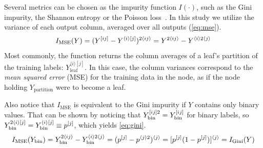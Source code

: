 Several metrics can be chosen as the impurity function $I(\cdot)$, such as the Gini impurity, the Shannon entropy or the Poisson loss~\cite{breiman1984classification}.  %
In this study we utilize the variance of each output column, averaged over all outputs (\autoref{eq:mse}). 
%
%
\begin{equation}
    I_\text{MSE}(Y)
        = (Y^{[ij]} - Y^{\langle i\rangle[j]})^{2\langle ij\rangle}
        = Y^{2\langle ij\rangle} - Y^{\langle i\rangle 2\langle j\rangle}
    \label{eq:mse}
\end{equation}
%
Most commonly, the  function returns the column averages of a leaf's partition of the training labels: $Y_\text{leaf}^{\langle i\rangle[j]}$.
In this case, the column variances correspond to the \emph{mean squared error} (MSE) for the training data in the node, as if the node holding $Y_\text{partition}$ were to become a leaf.
%
%

Also notice that $I_\text{MSE}$ is equivalent to the Gini impurity if $Y$ contains only binary values. That can be shown by noticing that $Y_\text{bin}^{[ij]2} = Y_\text{bin}^{[ij]}$ for binary labels, so $Y_\text{bin}^{2\langle i\rangle[j]}=Y_\text{bin}^{\langle i\rangle [j]}\equiv p^{[j]}$, which yields \autoref{eq:gini}.
%
\begin{equation}
    I_\text{MSE}(Y_\text{bin})
        = Y_\text{bin}^{2\langle ij\rangle} - Y_\text{bin}^{\langle i\rangle2\langle j\rangle}
        = (p^{[j]}  - p^{\langle j\rangle 2})^{\langle j \rangle}
        = [p^{[j]}(1 - p^{[j]})]^{\langle j \rangle}
    = I_\text{Gini}(Y)
    \label{eq:gini}
\end{equation}


